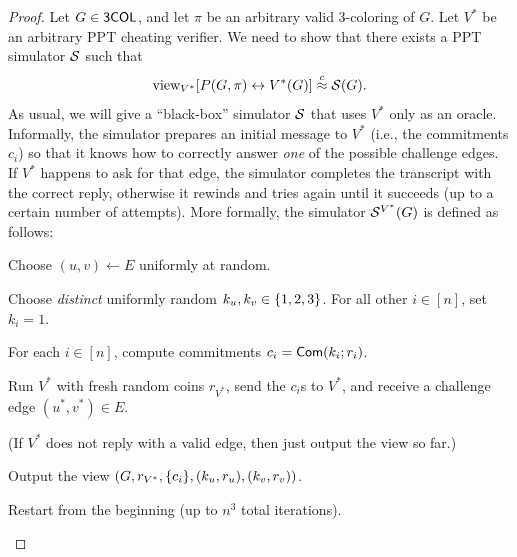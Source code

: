 \documentclass[11pt]{article}
\begin{document}
\begin{proof}
  Let $G \in \mathsf{3COL}$, and let $\pi$ be an arbitrary valid $3$-coloring
  of $G$.  Let $V^{*}$ be an arbitrary PPT cheating verifier.  We
  need to show that there exists a PPT simulator $\mathcal{S}$ such
  that \[\text{view}_{V^{*}}[P(G,\pi) \leftrightarrow V^{*}(G)] \stackrel{c}{\approx}
  \mathcal{S}(G). \] As usual, we will give a ``black-box'' simulator $\mathcal{S}$
  that uses $V^{*}$ only as an oracle.  Informally, the simulator
  prepares an initial message to $V^{*}$ (i.e., the commitments
  $c_{i}$) so that it knows how to correctly answer \emph{one} of the
  possible challenge edges.  If $V^{*}$ happens to ask for that edge,
  the simulator completes the transcript with the correct reply,
  otherwise it rewinds and tries again until it succeeds (up to a
  certain number of attempts).  More formally, the simulator
  $\mathcal{S}^{V^{*}}(G)$ is defined as follows:
  \begin{algorithmic}[1]
    \STATE Choose $(u, v) \gets E$ uniformly at random.
    
    \STATE Choose \emph{distinct} uniformly random $k_{u}, k_{v} \in
    \{1,2,3\}$.  For all other $i \in [n]$, set $k_{i} = 1$.
    
    \STATE For each $i \in [n]$, compute commitments $c_{i} =
    \mathsf{Com}(k_{i}; r_{i})$.

    \STATE Run $V^{*}$ with fresh random coins $r_{V^{*}}$, send the
    $c_{i}$s to $V^{*}$, and receive a challenge edge $(u^{*},v^{*})
    \in E$.
    
    (If $V^{*}$ does not reply with a valid edge, then just
    output the view so far.)

    
    \STATE Output the view $(G, r_{V^{*}}, \{c_{i}\}, (k_{u},
    r_{u}), (k_{v}, r_{v}))$.

    \ELSE

    \STATE Restart from the beginning (up to $n^{3}$ total
    iterations).

    \ENDIF
  \end{algorithmic}
  

\end{proof}
\end{document}
